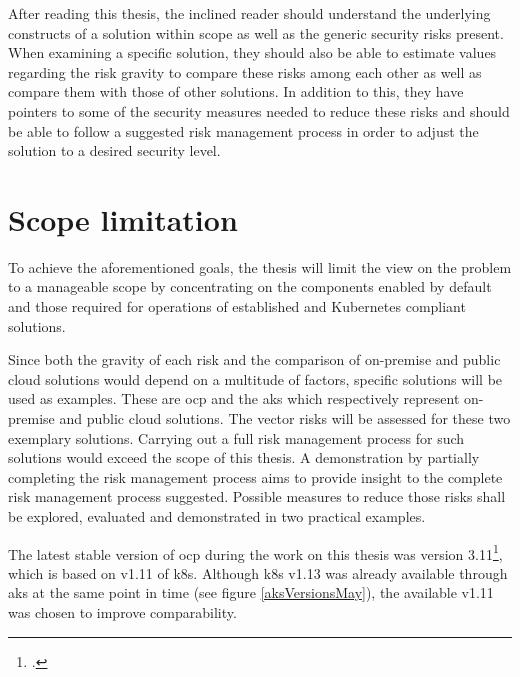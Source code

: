 After reading this thesis, the inclined reader should understand the underlying constructs of a solution within scope as well as the generic security risks present. When examining a specific solution, they should also be able to estimate values regarding the risk gravity to compare these risks among each other as well as compare them with those of other solutions. In addition to this, they have pointers to some of the security measures needed to reduce these risks and should be able to follow a suggested risk management process in order to adjust the solution to a desired security level.

\section{Scope limitation} \label{scopeLimit}

To achieve the aforementioned goals, the thesis will limit the view on the problem to a manageable scope by
concentrating on the components enabled by default and those required for operations of established and Kubernetes compliant solutions.

Since both the gravity of each risk and the comparison of on-premise and public cloud solutions would depend on a multitude of factors, specific solutions will be used as examples. These are \gls{ocp} and the \gls{aks} which respectively represent on-premise and public cloud solutions.
The vector risks will be assessed for these two exemplary solutions.
Carrying out a full risk management process for such solutions would exceed the scope of this thesis.
A demonstration by partially completing the risk management process aims to provide insight to the complete risk management process suggested.
Possible measures to reduce those risks shall be explored, evaluated and demonstrated in two practical examples.

The latest stable version of \gls{ocp} during the work on this thesis was version 3.11\footcite[][, see headline and date]{ocpRelease}, which is based on v1.11 of \gls{k8s}.
Although \gls{k8s} v1.13 was already available through \gls{aks} at the same point in time (see figure \ref{aksVersionsMay}), the available v1.11 was chosen to improve comparability.

